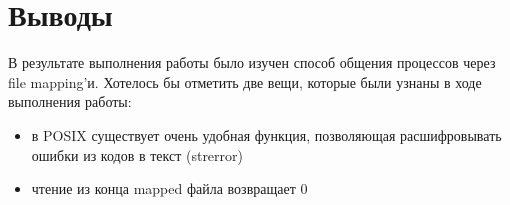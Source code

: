 \section{Выводы}

В результате выполнения работы было изучен способ общения процессов через file mapping'и.
Хотелось бы отметить две вещи, которые были узнаны в ходе выполнения работы:
\begin{itemize}
  \item в POSIX существует очень удобная функция, позволяющая расшифровывать ошибки из кодов в текст (strerror)
  \item чтение из конца mapped файла возвращает 0
\end{itemize}

\pagebreak
